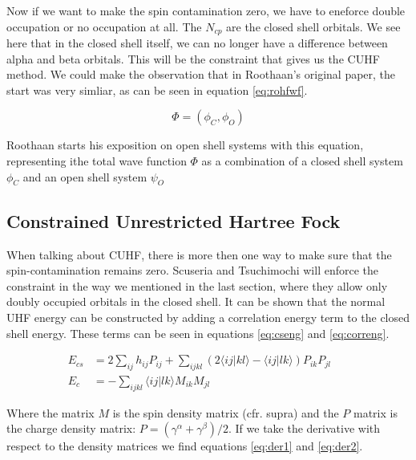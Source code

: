 \documentclass[twoside,twocolumn,9pt]{article}
\begin{document}
Now if we want to make the spin contamination zero, we have to eneforce double occupation or no occupation at all. The $N_{cp}$ are the closed shell orbitals. We see here that in
the closed shell itself, we can no longer have a difference between alpha and beta orbitals. This will be the constraint that gives us the CUHF method. We could make the observation
that in Roothaan's original paper, the start was very simliar, as can be seen in equation \eqref{eq:rohfwf}\cite{Roothaan1960}.

\begin{equation}\label{eq:rohfwf}
  \Phi = (\phi_C,\phi_O)
\end{equation}

Roothaan starts his exposition on open shell systems with this equation, representing ithe total wave function $\Phi$ as a combination of a closed shell system $\phi_C$ and 
an open shell system $\psi_O$

\subsection{Constrained Unrestricted Hartree Fock}
\label{subsec:cuhftheory}
When talking about CUHF, there is more then one way to make sure that the spin-contamination remains zero. Scuseria and Tsuchimochi will enforce the constraint in the way
we mentioned in the last section, where they allow only doubly occupied orbitals in the closed shell\cite{Scuseria2010}. It can be shown that the normal UHF energy can be 
constructed by adding a correlation energy term to the closed shell energy. These terms can be seen in equations \eqref{eq:cseng} and \eqref{eq:correng}\cite{Savin2010}.

\begin{subequations}
  \begin{align}
    \label{eq:cseng}
    E_{cs} & = 2\sum_{ij}h_{ij}P_{ij} + \sum_{ijkl}(2\langle ij|kl\rangle - \langle ij|lk \rangle)P_{ik}P_{jl} &  & \\
    \label{eq:correng}
    E_c    & = -\sum_{ijkl}\langle ij|lk \rangle M_{ik}M_{jl}                                                  &  &
  \end{align}
\end{subequations}

Where the matrix $M$ is the spin density matrix (cfr. supra) and the $P$ matrix is the charge density matrix: $P = (\gamma^\alpha + \gamma^\beta)/2$. If we take the
derivative with respect to the density matrices we find equations \eqref{eq:der1} and \eqref{eq:der2}.
\end{document}
